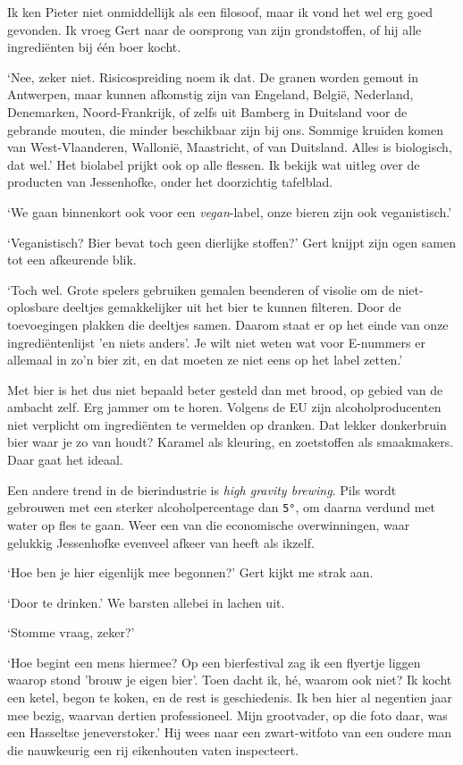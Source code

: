 \documentclass[
  11pt,
  dutch,
]{memoir}
\begin{document}
Ik ken Pieter niet onmiddellijk als een filosoof, maar ik vond het wel
erg goed gevonden. Ik vroeg Gert naar de oorsprong van zijn
grondstoffen, of hij alle ingrediënten bij één boer kocht.

`Nee, zeker niet. Risicospreiding noem ik dat. De granen worden gemout
in Antwerpen, maar kunnen afkomstig zijn van Engeland, België,
Nederland, Denemarken, Noord-Frankrijk, of zelfs uit Bamberg in
Duitsland voor de gebrande mouten, die minder beschikbaar zijn bij ons.
Sommige kruiden komen van West-Vlaanderen, Wallonië, Maastricht, of van
Duitsland. Alles is biologisch, dat wel.' Het biolabel prijkt ook op
alle flessen. Ik bekijk wat uitleg over de producten van Jessenhofke,
onder het doorzichtig tafelblad.

`We gaan binnenkort ook voor een \emph{vegan}-label, onze bieren zijn
ook veganistisch.'

`Veganistisch? Bier bevat toch geen dierlijke stoffen?' Gert knijpt zijn
ogen samen tot een afkeurende blik.

`Toch wel. Grote spelers gebruiken gemalen beenderen of visolie om de
niet-oplosbare deeltjes gemakkelijker uit het bier te kunnen filteren.
Door de toevoegingen plakken die deeltjes samen. Daarom staat er op het
einde van onze ingrediëntenlijst 'en niets anders'. Je wilt niet weten
wat voor E-nummers er allemaal in zo'n bier zit, en dat moeten ze niet
eens op het label zetten.'

Met bier is het dus niet bepaald beter gesteld dan met brood, op gebied
van de ambacht zelf. Erg jammer om te horen. Volgens de EU zijn
alcoholproducenten niet verplicht om ingrediënten te vermelden op
dranken. Dat lekker donkerbruin bier waar je zo van houdt? Karamel als
kleuring, en zoetstoffen als smaakmakers. Daar gaat het ideaal.

Een andere trend in de bierindustrie is \emph{high gravity brewing}.
Pils wordt gebrouwen met een sterker alcoholpercentage dan \texttt{5°},
om daarna verdund met water op fles te gaan. Weer een van die
economische overwinningen, waar gelukkig Jessenhofke evenveel afkeer van
heeft als ikzelf.

`Hoe ben je hier eigenlijk mee begonnen?' Gert kijkt me strak aan.

`Door te drinken.' We barsten allebei in lachen uit.

`Stomme vraag, zeker?'

`Hoe begint een mens hiermee? Op een bierfestival zag ik een flyertje
liggen waarop stond 'brouw je eigen bier'. Toen dacht ik, hé, waarom ook
niet? Ik kocht een ketel, begon te koken, en de rest is geschiedenis. Ik
ben hier al negentien jaar mee bezig, waarvan dertien professioneel.
Mijn grootvader, op die foto daar, was een Hasseltse jeneverstoker.' Hij
wees naar een zwart-witfoto van een oudere man die nauwkeurig een rij
eikenhouten vaten inspecteert.
\end{document}

